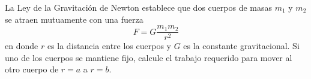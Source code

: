 \item La Ley de la Gravitación de Newton establece que dos cuerpos de masas $m_1$ y $m_2$ se atraen mutuamente con una fuerza
$$F = G \frac{m_1 m_2}{r^2}$$
en donde $r$ es la distancia entre los cuerpos y $G$ es la constante gravitacional. Si uno de los cuerpos se mantiene fijo, calcule el trabajo requerido para mover al otro cuerpo de $r = a$ a $r = b$.

